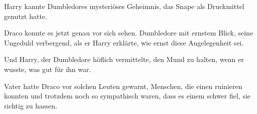 Harry kannte Dumbledores mysteriöses Geheimnis, das Snape als Druckmittel genutzt hatte.

Draco konnte es jetzt genau vor sich sehen. Dumbledore mit ernstem Blick, seine Ungeduld verbergend, als er Harry erklärte, wie ernst diese Angelegenheit sei.

Und Harry, der Dumbledore höflich vermittelte, den Mund zu halten, wenn er wusste, was gut für ihn war.

Vater hatte Draco vor solchen Leuten gewarnt, Menschen, die einen ruinieren konnten und trotzdem noch so sympathisch waren, dass es einem schwer fiel, sie richtig zu hassen.

